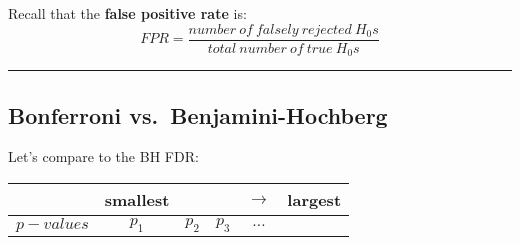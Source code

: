 \documentclass[]{article}
\begin{document}
Recall that the \textbf{false positive rate} is:
\[FPR=\frac{number\:of\:falsely\:rejected\:H_0s}{total\:number\:of\:true\:H_0s}\]

\begin{center}\rule{0.5\linewidth}{\linethickness}\end{center}

\hypertarget{bonferroni-vs.-benjamini-hochberg}{%
\subsection{Bonferroni
vs.~Benjamini-Hochberg}\label{bonferroni-vs.-benjamini-hochberg}}

Let's compare to the BH FDR:

\begin{longtable}[]{@{}cccccc@{}}
\toprule
\begin{minipage}[b]{0.10\columnwidth}\centering
\strut
\end{minipage} & \begin{minipage}[b]{0.13\columnwidth}\centering
smallest\strut
\end{minipage} & \begin{minipage}[b]{0.10\columnwidth}\centering
\strut
\end{minipage} & \begin{minipage}[b]{0.10\columnwidth}\centering
\strut
\end{minipage} & \begin{minipage}[b]{0.25\columnwidth}\centering
\(\rightarrow\)\strut
\end{minipage} & \begin{minipage}[b]{0.15\columnwidth}\centering
largest\strut
\end{minipage}\tabularnewline
\midrule
\endhead
\begin{minipage}[t]{0.10\columnwidth}\centering
\(p-values\)\strut
\end{minipage} & \begin{minipage}[t]{0.13\columnwidth}\centering
\(p_1\)\strut
\end{minipage} & \begin{minipage}[t]{0.10\columnwidth}\centering
\(p_2\)\strut
\end{minipage} & \begin{minipage}[t]{0.10\columnwidth}\centering
\(p_3\)\strut
\end{minipage} & \begin{minipage}[t]{0.25\columnwidth}\centering
\(\dotsc\)\strut
\end{minipage} & \begin{minipage}[t]{0.15\columnwidth}\centering

\end{minipage}
\end{longtable}
\end{document}
